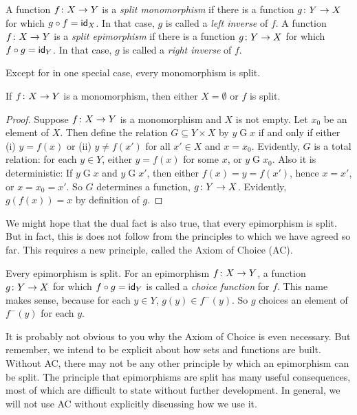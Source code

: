 \begin{defn}
	A function ${f}\colon{X}\to{Y}$ is a \emph{split monomorphism} if there is a function ${g}\colon{Y}\to{X}$ for which $g\circ f = \textsf{id}_X$. In that case, $g$ is called a \emph{left inverse} of $f$. A function ${f}\colon{X}\to{Y}$ is a \emph{split epimorphism} if there is a function ${g}\colon{Y}\to{X}$ for which $f\circ g=\textsf{id}_Y$. In that case, $g$ is called a \emph{right inverse} of $f$.
\end{defn}

Except for in one special case, every monomorphism is split.

\begin{lemma}
	If ${f}\colon{X}\to{Y}$ is a monomorphism, then either $X=\emptyset$ or $f$ is split.
	
	\begin{proof}
		Suppose ${f}\colon{X}\to{Y}$ is a monomorphism and $X$ is not empty.
		Let $x_0$ be an element of $X$.
		Then define the relation $G\subseteq Y\times X$ by $y\mathrel{G} x$ if and only if either (i) $y = f(x)$ or (ii) $y\neq f(x')$ for all $x'\in X$ and $x=x_0$.
		Evidently, $G$ is a total relation: for each $y\in Y$, either $y=f(x)$ for some $x$, or $y\mathrel{G}x_0$. 
		Also it is deterministic: If $y\mathrel{G} x$ and $y\mathrel{G} x'$, then either $f(x)=y=f(x')$, hence $x=x'$, or $x=x_0=x'$. 
		So $G$ determines a function, ${g}\colon{Y}\to{X}$.
		Evidently, $g(f(x))=x$ by definition of $g$.
	\end{proof}
\end{lemma}

We might hope that the dual fact is also true, that every epimorphism is split. But in fact, this is does not follow from the principles to which we have agreed so far.
This requires a new principle, called the Axiom of Choice (AC).

\begin{principle}
	Every epimorphism is split. For an epimorphism ${f}\colon{X}\to{Y}$, a function ${g}\colon{Y}\to{X}$ for which $f\circ g = \textsf{id}_Y$ is called a \emph{choice function}
	for $f$. This name makes sense, because for each $y\in Y$, $g(y)\in f^-(y)$. So $g$ choices  an element of $f^-(y)$ for each $y$.
\end{principle}

It is probably not obvious to you why the Axiom of Choice is even necessary. But remember, we intend to be explicit about how sets and functions are built. 
Without AC, there may not be any other principle by which an epimorphism can be split.
The principle that epimorphisms are split has many useful consequences, most of which are difficult to state without further development.
In general, we will not use AC without explicitly discussing how we use it.

